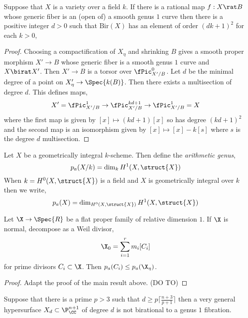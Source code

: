 \documentclass[12pt]{article}
\begin{document}
\newcommand{\Bir}{\mathrm{Bir}}

\begin{lemma}
Suppose that $X$ is a variety over a field $k$. If there is a rational map $f : X \rat B$ whose generic fiber is an (open of) a smooth genus $1$ curve then there is a positive integer $d > 0$ such that $\Bir(X)$ has an element of order $(d k + 1)^2$ for each $k > 0$,
\end{lemma}

\begin{proof}
Choosing a compactification of $X_\eta$ and shrinking $B$ gives a smooth proper morphism $X' \to B$ whose generic fiber is a smooth genus $1$ curve and $X \birat X'$. Then $X' \to B$ is a torsor over $\fPic^0_{X'/B}$. Let $d$ be the minimal degree of a point on $X'_{\eta} \to \Spec{k(B)}$. Then there exists a multisection of degree $d$. This defines maps,
 \[ X' = \fPic^{1}_{X'/B} \to \fPic^{kd + 1}_{X'/B} \to \fPic^{1}_{X'/B} = X \]
 where the first map is given by $[x] \mapsto (kd + 1) [x]$ so has degree $(kd+1)^2$ and the second map is an isomorphism given by $[x] \mapsto [x] - k [s]$ where $s$ is the degree $d$ multisection. 
\end{proof}


\begin{defn}
Let $X$ be a geometrically integral $k$-scheme. Then define the \textit{arithmetic genus},
\[ p_a(X/k) = \dim_{k} H^1(X, \struct{X}) \]
When $k = H^0(X, \struct{X})$ is a field and $X$ is geometrically integral over $k$ then we write,
\[ p_a(X) = \dim_{H^0(X, \struct{X})} H^1(X, \struct{X}) \]
\end{defn}

\begin{prop}
Let $\X \to \Spec{R}$ be a flat proper family of relative dimension $1$. If $\X$ is normal, decompose as a Weil divisor,
\[ \X_0 = \sum_{i = 1}^r m_i [C_i] \]
for prime divisors $C_i \subset \X$. Then $p_a(C_i) \le p_a(\X_\eta)$.
\end{prop}

\begin{proof}
Adapt the proof of the main result above. (DO TO)
\end{proof}


\begin{theorem}
Suppose that there is a prime $p > 3$ such that $d \ge p \lceil \frac{n+3}{p+1} \rceil$ then a very general hypersurface $X_d \subset \P_{\CC}^{n+1}$ of degree $d$ is not birational to a genus $1$ fibration.
\end{theorem}
\end{document}
